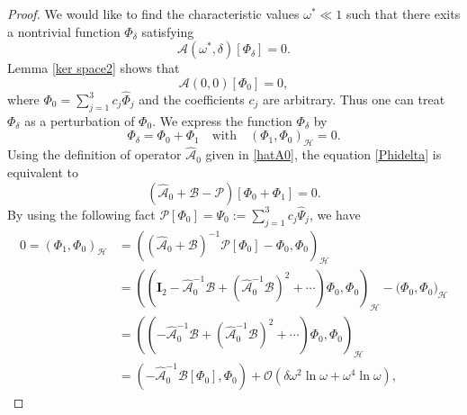 \documentclass[10pt,reqno,oneside]{amsart}%
\theoremstyle{definition}
\theoremstyle{remark}
\numberwithin{equation}{section}
\numberwithin{equation}{section}
\begin{document}
\begin{proof}
We would like to find the characteristic values $\omega^{*} \ll 1$ such that there exits a nontrivial function $\Phi_{\delta}$ satisfying
\begin{equation}\label{Phidelta}
\mathcal{A}(\omega^{*}, \delta)[\Phi_{\delta}]=0.
\end{equation}
Lemma \ref{ker space2} shows that
$$
\mathcal{A}(0,0)[\Phi_{0}]=0,
$$ where $\Phi_{0}=\sum_{j=1}^{3} c_{j} \hat{\Phi}_{j}$ and the coefficients $c_{j}$ are arbitrary. Thus one can treat $\Phi_{\delta}$ as a perturbation of $\Phi_{0}$. We express the function $\Phi_{\delta}$ by
$$
\Phi_{\delta}=\Phi_{0}+\Phi_{1} \quad \text{with}\quad (\Phi_{1}, \Phi_{0})_{\mathcal{H}}=0.
$$
Using the definition of operator $\hat{\mathcal{A}}_{0}$ given in \eqref{hatA0}, the equation \eqref{Phidelta} is equivalent to
$$
(\hat{\mathcal{A}}_{0}+\mathcal{B}-\mathcal{P})[\Phi_{0}+\Phi_{1}]=0.
$$
By using the following fact $\mathcal{P}[\Phi_{0}]=\Psi_{0}:=\sum_{j=1}^{3} c_{j} \hat{\Psi}_{j}$, we have
\begin{align}\label{0}
0=(\Phi_{1},\Phi_{0})_{\mathcal{H}}&=\left((\hat{\mathcal{A}}_{0}+\mathcal{B})^{-1}\mathcal{P}[\Phi_{0}]-\Phi_{0},\Phi_{0}\right)_{\mathcal{H}} \nonumber\\
&=\left((\mathbf{I}_2-\hat{\mathcal{A}}_{0}^{-1}\mathcal{B}+(\hat{\mathcal{A}}_{0}^{-1} \mathcal{B})^{2}+\cdots){\Phi_{0}},{\Phi_{0}}\right)_{\mathcal{H}}-\Big(\Phi_{0}, \Phi_{0}\Big)_{\mathcal{H}} \nonumber \\
&=\left((-\hat{\mathcal{A}}_{0}^{-1}\mathcal{B}+(\hat{\mathcal{A}}_{0}^{-1}\mathcal{B})^{2}+\cdots)\Phi_{0},\Phi_{0}\right)_{\mathcal{H}}\nonumber\\
&=\left(-\hat{\mathcal{A}}_{0}^{-1}\mathcal{B}[\Phi_{0}],\Phi_{0}\right)+\mathcal{O}\left(\delta\omega^2\ln{\omega}+\omega^4\ln{\omega}\right),

\end{align}
\end{proof}
\end{document}
